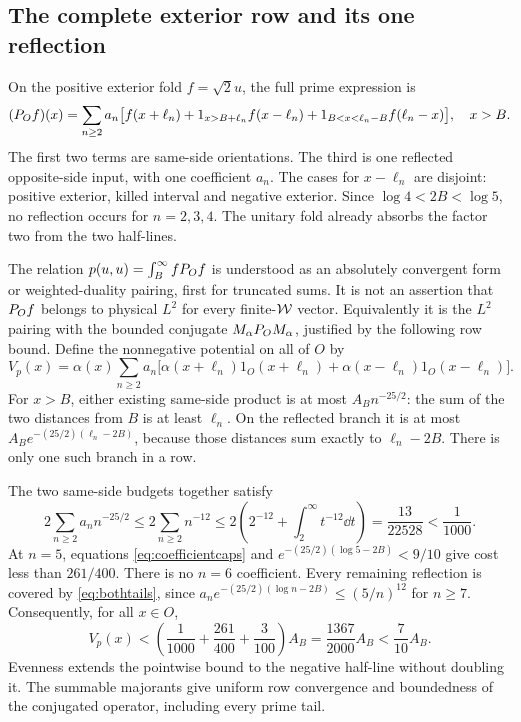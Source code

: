 \subsection{The complete exterior row and its one reflection}
On the positive exterior fold $f=\sqrt2u$, the full prime expression is
\begin{equation}\label{eq:exteriorfold}
 (P_Of)(x)=\sum_{n\ge2}a_n\big[
 f(x+\ell_n)+1_{x>B+\ell_n}f(x-\ell_n)
 +1_{B<x<\ell_n-B}f(\ell_n-x)\big],\quad x>B.
\end{equation}
The first two terms are same-side orientations. The third is one
reflected opposite-side input, with one coefficient $a_n$. The cases
for $x-\ell_n$ are disjoint: positive exterior, killed interval and
negative exterior. Since $\log4<2B<\log5$, no reflection occurs for
$n=2,3,4$. The unitary fold already absorbs the factor two from the
two half-lines.

The relation $p(u,u)=\int_B^\infty fP_Of$ is understood as an
absolutely convergent form or weighted-duality pairing, first for
truncated sums. It is not an assertion that $P_Of$ belongs to
physical $L^2$ for every finite-$\mathcal W$ vector. Equivalently it is the
$L^2$ pairing with the bounded conjugate
$M_\alpha P_OM_\alpha$, justified by the following row bound.
Define the nonnegative potential on all of $O$ by
\begin{equation}\label{eq:primepotential}
 V_p(x)=\alpha(x)\sum_{n\ge2}a_n
 \big[\alpha(x+\ell_n)1_O(x+\ell_n)
      +\alpha(x-\ell_n)1_O(x-\ell_n)\big].
\end{equation}
For $x>B$, either existing same-side product is at most
$A_Bn^{-25/2}$: the sum of the two distances from $B$ is at least
$\ell_n$. On the reflected branch it is at most
$A_Be^{-(25/2)(\ell_n-2B)}$, because those distances sum exactly to
$\ell_n-2B$. There is only one such branch in a row.

The two same-side budgets together satisfy
\[
 2\sum_{n\ge2}a_nn^{-25/2}\le2\sum_{n\ge2}n^{-12}
 \le2\left(2^{-12}+\int_2^\infty t^{-12}\dd t\right)
 =\frac{13}{22528}<\frac1{1000}.
\]
At $n=5$, equations \eqref{eq:coefficientcaps} and
$e^{-(25/2)(\log5-2B)}<9/10$ give cost less than $261/400$.
There is no $n=6$ coefficient. Every remaining reflection is covered by
\eqref{eq:bothtails}, since
$a_ne^{-(25/2)(\log n-2B)}\le(5/n)^{12}$ for $n\ge7$.
Consequently, for all $x\in O$,
\begin{equation}\label{eq:primecap}
 V_p(x)<\left(\frac1{1000}+\frac{261}{400}+\frac3{100}\right)A_B
 =\frac{1367}{2000}A_B<\frac7{10}A_B.
\end{equation}
Evenness extends the pointwise bound to the negative half-line without
doubling it. The summable majorants give uniform row convergence and
boundedness of the conjugated operator, including every prime tail.

